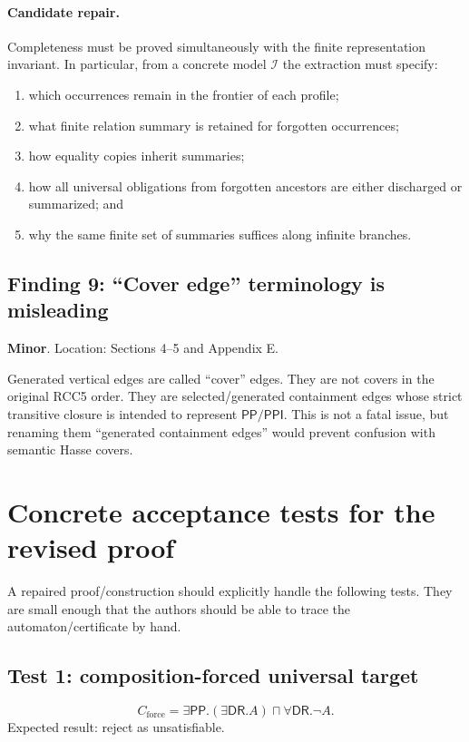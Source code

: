 \documentclass[11pt]{article}
\newcommand{\PP}{\mathsf{PP}}
\newcommand{\PPI}{\mathsf{PPI}}
\newcommand{\DR}{\mathsf{DR}}
\newcommand{\Minor}{\textbf{\textcolor{minr}{Minor}}}
\begin{document}
\paragraph{Candidate repair.}
Completeness must be proved simultaneously with the finite representation invariant.  In particular, from a concrete model $\mathcal I$ the extraction must specify:
\begin{enumerate}[label=(C\arabic*)]
\item which occurrences remain in the frontier of each profile;
\item what finite relation summary is retained for forgotten occurrences;
\item how equality copies inherit summaries;
\item how all universal obligations from forgotten ancestors are either discharged or summarized; and
\item why the same finite set of summaries suffices along infinite branches.
\end{enumerate}

\subsection{Finding 9: ``Cover edge'' terminology is misleading}

\noindent\Minor.  Location: Sections 4--5 and Appendix E.

Generated vertical edges are called ``cover'' edges.  They are not covers in the original RCC5 order.  They are selected/generated containment edges whose strict transitive closure is intended to represent $\PP/\PPI$.  This is not a fatal issue, but renaming them ``generated containment edges'' would prevent confusion with semantic Hasse covers.

\section{Concrete acceptance tests for the revised proof}

A repaired proof/construction should explicitly handle the following tests.  They are small enough that the authors should be able to trace the automaton/certificate by hand.

\subsection{Test 1: composition-forced universal target}

\[
C_{\mathrm{force}} = \exists\PP.(\exists\DR.A) \sqcap \forall\DR.\neg A .
\]
Expected result: reject as unsatisfiable.
\end{document}
